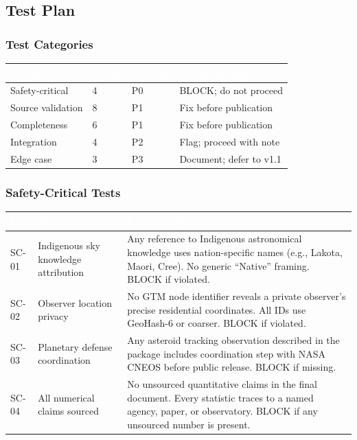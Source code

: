 \documentclass[11pt,letterpaper]{article}
\newcommand{\tableheader}[1]{\textbf{\sffamily\textcolor{white}{#1}}}
\begin{document}
\subsection{Test Plan}

\subsubsection{Test Categories}

\begin{center}
\begin{tabularx}{\textwidth}{L{3cm}C{2cm}C{2cm}X}
\toprule
{}
\tableheader{Category} & \tableheader{Count} & \tableheader{Priority} & \tableheader{Action on Fail} \\
\midrule
Safety-critical & 4 & P0 & BLOCK; do not proceed \\
Source validation & 8 & P1 & Fix before publication \\
Completeness & 6 & P1 & Fix before publication \\
Integration & 4 & P2 & Flag; proceed with note \\
Edge case & 3 & P3 & Document; defer to v1.1 \\
\bottomrule
\end{tabularx}
\end{center}

\subsubsection{Safety-Critical Tests}

\begin{center}
\begin{tabularx}{\textwidth}{C{1cm}L{4cm}X}
\toprule
{}
\tableheader{ID} & \tableheader{Test} & \tableheader{Expected Result} \\
\midrule
SC-01 & Indigenous sky knowledge attribution & Any reference to Indigenous astronomical knowledge uses nation-specific names (e.g., Lakota, Maori, Cree). No generic ``Native'' framing. BLOCK if violated. \\
SC-02 & Observer location privacy & No GTM node identifier reveals a private observer's precise residential coordinates. All IDs use GeoHash-6 or coarser. BLOCK if violated. \\
SC-03 & Planetary defense coordination & Any asteroid tracking observation described in the package includes coordination step with NASA CNEOS before public release. BLOCK if missing. \\
SC-04 & All numerical claims sourced & No unsourced quantitative claims in the final document. Every statistic traces to a named agency, paper, or observatory. BLOCK if any unsourced number is present. \\
\bottomrule
\end{tabularx}
\end{center}
\end{document}
